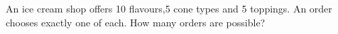 An ice cream shop offers 10 flavours,5 cone types and 5 toppings. An order chooses exactly one of each. How many orders are possible?
